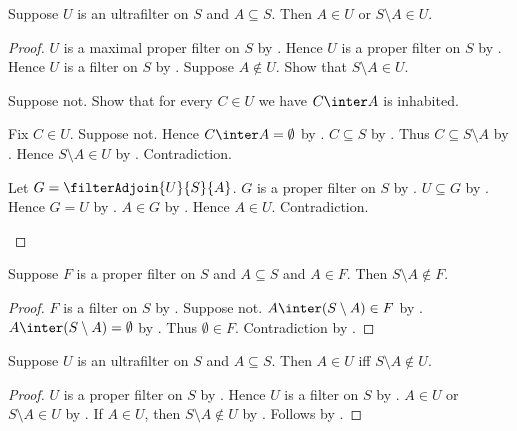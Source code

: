 \begin{theorem}\label{ultrafilter_decides_subset}
    Suppose $U$ is an ultrafilter on $S$ and $A\subseteq S$.
    Then $A\in U$ or $S\setminus A\in U$.
\end{theorem}
\begin{proof}
    $U$ is a maximal proper filter on $S$ by .
    Hence $U$ is a proper filter on $S$ by .
    Hence $U$ is a filter on $S$ by .
    Suppose $A\notin U$.
    Show that $S\setminus A\in U$.
    \begin{subproof}
        Suppose not.
        Show that for every $C\in U$ we have $C\inter A$ is inhabited.
        \begin{subproof}
            Fix $C\in U$.
            Suppose not.
            Hence $C\inter A=\emptyset$
                by .
            $C\subseteq S$ by .
            Thus $C\subseteq S\setminus A$
                by .
            Hence $S\setminus A\in U$
                by .
            Contradiction.
        \end{subproof}
        Let $G=\filterAdjoin{U}{S}{A}$.
        $G$ is a proper filter on $S$
            by .
        $U\subseteq G$ by .
        Hence $G=U$ by .
        $A\in G$ by .
        Hence $A\in U$.
        Contradiction.
    \end{subproof}
\end{proof}

\begin{proposition}\label{filter_excludes_complement}
    Suppose $F$ is a proper filter on $S$ and
        $A\subseteq S$ and $A\in F$.
    Then $S\setminus A\notin F$.
\end{proposition}
\begin{proof}
    $F$ is a filter on $S$ by .
    Suppose not.
    $A\inter(S\setminus A)\in F$
        by .
    $A\inter(S\setminus A)=\emptyset$
        by .
    Thus $\emptyset\in F$.
    Contradiction by .
\end{proof}

\begin{corollary}\label{ultrafilter_exactly_one_subset_or_complement}
    Suppose $U$ is an ultrafilter on $S$ and $A\subseteq S$.
    Then $A\in U$ iff $S\setminus A\notin U$.
\end{corollary}
\begin{proof}
    $U$ is a proper filter on $S$ by .
    Hence $U$ is a filter on $S$ by .
    $A\in U$ or $S\setminus A\in U$
        by .
    If $A\in U$, then $S\setminus A\notin U$
        by .
    Follows by \auto.
\end{proof}

